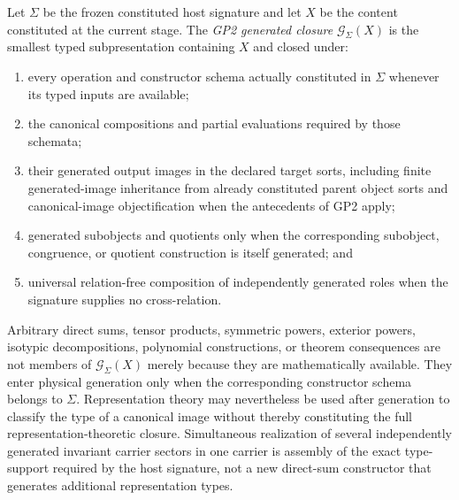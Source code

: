\documentclass[12pt,a4paper]{article}
\begin{document}
\begin{definition}
\label{p2:def:gp2-generated-closure}
Let \(\Sigma\) be the frozen constituted host signature and let \(X\) be the
content constituted at the current stage.  The \emph{GP2 generated closure}
\(\mathcal G_\Sigma(X)\) is the smallest typed subpresentation containing
\(X\) and closed under:
\begin{enumerate}[label=(\roman*),leftmargin=2em]
\item every operation and constructor schema actually constituted in
\(\Sigma\) whenever its typed inputs are available;
\item the canonical compositions and partial evaluations required by those
schemata;
\item their generated output images in the declared target sorts, including
finite generated-image inheritance from already constituted parent object
sorts and canonical-image objectification when the antecedents of GP2 apply;
\item generated subobjects and quotients only when the corresponding
subobject, congruence, or quotient construction is itself generated; and
\item universal relation-free composition of independently generated roles
when the signature supplies no cross-relation.
\end{enumerate}
Arbitrary direct sums, tensor products, symmetric powers, exterior powers,
isotypic decompositions, polynomial constructions, or theorem consequences
are not members of \(\mathcal G_\Sigma(X)\) merely because they are
mathematically available.  They enter physical generation only when the
corresponding constructor schema belongs to \(\Sigma\).  Representation theory may nevertheless be used after generation to classify
the type of a canonical image without thereby constituting the full
representation-theoretic closure.  Simultaneous realization of several
independently generated invariant carrier sectors in one carrier is assembly of
the exact type-support required by the host signature, not a new direct-sum
constructor that generates additional representation types.
\end{definition}
\end{document}
